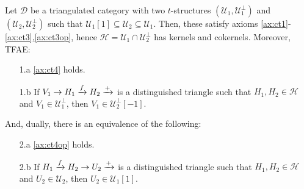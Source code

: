 \begin{example}
  Let $\mathcal{D}$ be a triangulated category with two $t$-structures
  $(\mathcal{U}_1,\mathcal{U}_1^\perp)$ and $(\mathcal{U}_2,\mathcal{U}_2^\perp)$ such that
  $\mathcal{U}_1[1]\subseteq\mathcal{U}_2\subseteq\mathcal{U}_1$. Then, these satisfy
  axioms \ref{ax:ct1}-\ref{ax:ct3},\ref{ax:ct3op}, hence $\mathcal{H}=\mathcal{U}_1\cap\mathcal{U}_2^\perp$ has
  kernels and cokernels. Moreover, TFAE:
  \begin{enumerate}
    \item[1.a] \ref{ax:ct4} holds.
    \item[1.b] If $V_1\to H_1\xrightarrow{f} H_2\xrightarrow{+}$ is a distinguished triangle such
    that $H_1, H_2\in\mathcal{H}$ and $V_1\in\mathcal{U}_1^\perp$, then $V_1\in\mathcal{U}_2^\perp[-1]$.
  \end{enumerate}
  And, dually, there is an equivalence of the following:
  \begin{enumerate}
    \item[2.a] \ref{ax:ct4op} holds.
    \item[2.b]\label{ax:eqa} If $H_1\xrightarrow{f}H_2\to U_2\xrightarrow{+}$ is a distinguished triangle such
    that $H_1,H_2\in\mathcal{H}$ and $U_2\in\mathcal{U}_2$, then $U_2\in\mathcal{U}_1[1]$.
  \end{enumerate}
\end{example}

